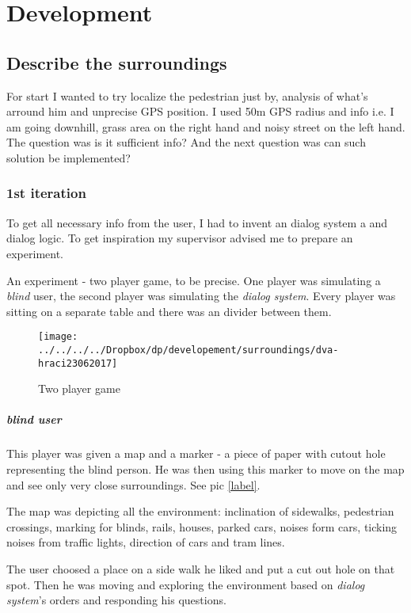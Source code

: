 	\chapter{Development}
		\section{Describe the surroundings}
			For start I wanted to try localize the pedestrian just by, analysis of what's arround him and unprecise GPS position. I used 50m GPS radius and info i.e. I am going downhill, grass area on the right hand and noisy street on the left hand. The question was is it sufficient info? And the next question was can such solution be implemented?
			\subsection{1st iteration}
				To get all necessary info from the user, I had to invent an dialog system a and dialog logic. To get inspiration my supervisor advised me to prepare an experiment.
				
				An experiment - two player game, to be precise. One player was simulating a \emph{blind} user, the second player was simulating the \emph{dialog system}. Every player was sitting on a separate table and there was an divider between them.
				
				\begin{figure}[th]
					\centering
					\texttt{[image: ../../../../Dropbox/dp/developement/surroundings/dva-hraci23062017]}
					\caption{Two player game}
					\label{fig:two-players}
				\end{figure}
			
				
				\paragraph{blind user}
					This player was given a map and a marker - a piece of paper with cutout hole representing the blind person. He was then using this  marker to move on the map and see only very close surroundings. See pic \ref{label}.
					
					The map was depicting all the environment: inclination of sidewalks, pedestrian crossings,
					marking for blinds, rails, houses, parked cars, noises form cars, ticking noises from traffic	lights, direction of cars and tram lines.
					
					The user choosed a place on a side walk he liked and put a cut out hole on that spot.
					Then he was moving and exploring the environment based
					on \emph{dialog system}'s orders and responding his questions.
